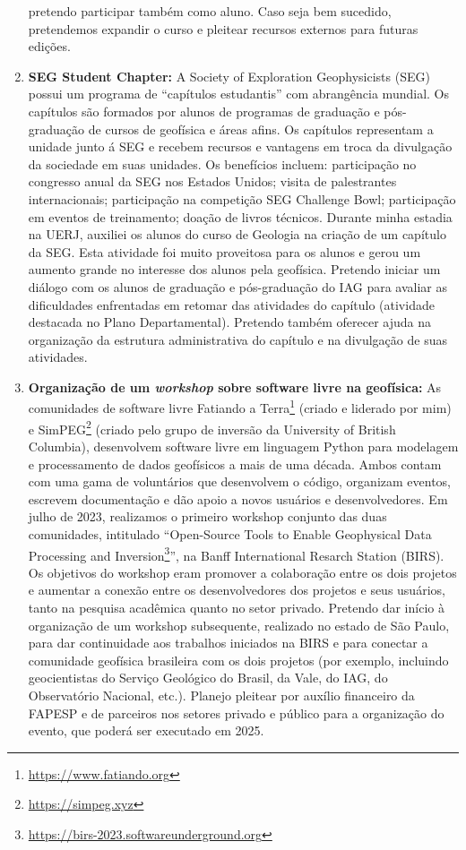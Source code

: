 \documentclass[12pt,a4paper,oneside]{book}
\begin{document}
\begin{enumerate}
    pretendo participar também como aluno. Caso seja bem sucedido, pretendemos
    expandir o curso e pleitear recursos externos para futuras edições.
  \item \textbf{SEG Student Chapter:} A Society of Exploration Geophysicists
    (SEG) possui um programa de ``capítulos estudantis'' com abrangência
    mundial. Os capítulos são formados por alunos de programas de graduação e
    pós-graduação de cursos de geofísica e áreas afins. Os capítulos
    representam a unidade junto á SEG e recebem recursos e vantagens em troca
    da divulgação da sociedade em suas unidades. Os benefícios incluem:
    participação no congresso anual da SEG nos Estados Unidos; visita de
    palestrantes internacionais; participação na competição SEG Challenge Bowl;
    participação em eventos de treinamento; doação de livros técnicos. Durante
    minha estadia na UERJ, auxiliei os alunos do curso de Geologia na criação
    de um capítulo da SEG. Esta atividade foi muito proveitosa para os alunos
    e gerou um aumento grande no interesse dos alunos pela geofísica. Pretendo
    iniciar um diálogo com os alunos de graduação e pós-graduação do IAG para
    avaliar as dificuldades enfrentadas em retomar das atividades do capítulo
    (atividade destacada no Plano Departamental). Pretendo também oferecer
    ajuda na organização da estrutura administrativa do capítulo e na
    divulgação de suas atividades.
  \item \textbf{Organização de um \emph{workshop} sobre software livre na
    geofísica:}
    As comunidades de software livre Fatiando a
    Terra\footnote{\url{https://www.fatiando.org}} (criado e liderado por mim)
    e SimPEG\footnote{\url{https://simpeg.xyz}}
    (criado pelo grupo de inversão da University of British Columbia),
    desenvolvem software livre em linguagem Python para modelagem e
    processamento de dados geofísicos a mais de uma década. Ambos contam com uma
    gama de voluntários que desenvolvem o código, organizam eventos, escrevem
    documentação e dão apoio a novos usuários e desenvolvedores.
    Em julho de 2023, realizamos o primeiro workshop conjunto das duas
    comunidades, intitulado
    ``Open-Source Tools to Enable Geophysical Data Processing and
    Inversion\footnote{\url{https://birs-2023.softwareunderground.org}}'', na
    Banff International Resarch Station (BIRS). Os objetivos do workshop eram
    promover a colaboração entre os dois projetos e aumentar a conexão entre os
    desenvolvedores dos projetos e seus usuários, tanto na pesquisa acadêmica
    quanto no setor privado. Pretendo dar início à organização de um workshop
    subsequente, realizado no estado de São Paulo, para dar continuidade aos
    trabalhos iniciados na BIRS e para conectar a comunidade geofísica
    brasileira com os dois projetos (por exemplo, incluindo geocientistas do
    Serviço Geológico do Brasil, da Vale, do IAG, do Observatório Nacional,
    etc.). Planejo pleitear por auxílio financeiro da FAPESP e de parceiros nos
    setores privado e público para a organização do evento, que poderá ser
    executado em 2025.
\end{enumerate}
\end{document}
